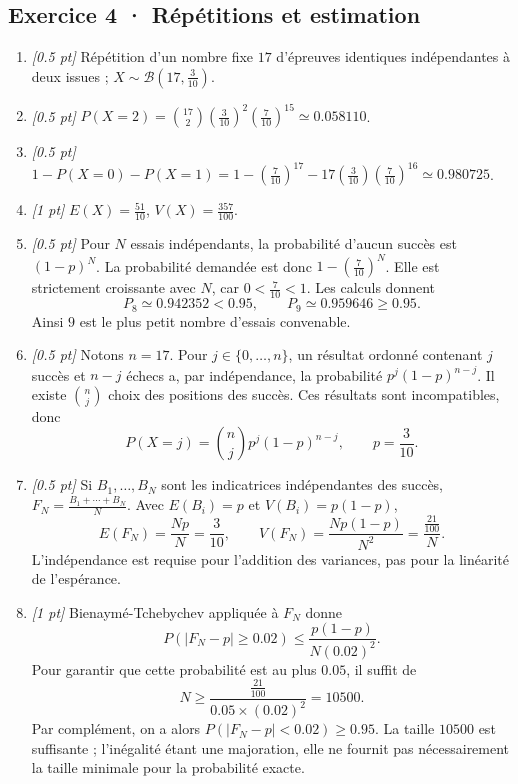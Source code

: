 \subsection*{Exercice 4 · Répétitions et estimation}\begin{enumerate}

\item \textit{[\num{0,5} pt]} Répétition d'un nombre fixe $17$ d'épreuves identiques indépendantes à deux issues ; $X\sim\mathcal B(17,\frac{3}{10})$.

\item \textit{[\num{0,5} pt]} $P(X=2)=\binom{17}2(\frac{3}{10})^2(\frac{7}{10})^{15}\simeq\num{0,058110}$.

\item \textit{[\num{0,5} pt]} $1-P(X=0)-P(X=1)=1-(\frac{7}{10})^{17}-17(\frac{3}{10})(\frac{7}{10})^{16}\simeq\num{0,980725}$.

\item \textit{[1 pt]} $E(X)=\frac{51}{10}$, $V(X)=\frac{357}{100}$.

\item \textit{[\num{0,5} pt]} Pour $N$ essais indépendants, la probabilité d'aucun succès est $(1-p)^N$. La probabilité demandée est donc $1-(\frac{7}{10})^N$. Elle est strictement croissante avec $N$, car $0<\frac{7}{10}<1$. Les calculs donnent
\[P_{8}\simeq\num{0,942352}<\num{0,95},\qquad P_{9}\simeq\num{0,959646}\ge\num{0,95}.\]
Ainsi $9$ est le plus petit nombre d'essais convenable.

\item \textit{[\num{0,5} pt]} Notons $n=17$. Pour $j\in\{0,\ldots,n\}$, un résultat ordonné contenant $j$ succès et $n-j$ échecs a, par indépendance, la probabilité $p^j(1-p)^{n-j}$. Il existe $\binom nj$ choix des positions des succès. Ces résultats sont incompatibles, donc
\[P(X=j)=\binom nj p^j(1-p)^{n-j},\qquad p=\frac{3}{10}.\]

\item \textit{[\num{0,5} pt]} Si $B_1,\ldots,B_N$ sont les indicatrices indépendantes des succès, $F_N=\frac{B_1+\cdots+B_N}{N}$. Avec $E(B_i)=p$ et $V(B_i)=p(1-p)$,
\[E(F_N)=\frac{Np}{N}=\frac{3}{10},\qquad V(F_N)=\frac{Np(1-p)}{N^2}=\frac{\frac{21}{100}}{N}.\]
L'indépendance est requise pour l'addition des variances, pas pour la linéarité de l'espérance.

\item \textit{[1 pt]} Bienaymé-Tchebychev appliquée à $F_N$ donne
\[P(|F_N-p|\ge\num{0,02})\le\frac{p(1-p)}{N(\num{0,02})^2}.\]
Pour garantir que cette probabilité est au plus $\num{0,05}$, il suffit de
\[N\ge\frac{\frac{21}{100}}{\num{0,05}\times(\num{0,02})^2}=10500.\]
Par complément, on a alors $P(|F_N-p|<\num{0,02})\ge\num{0,95}$. La taille $10500$ est suffisante ; l'inégalité étant une majoration, elle ne fournit pas nécessairement la taille minimale pour la probabilité exacte.

\end{enumerate}


